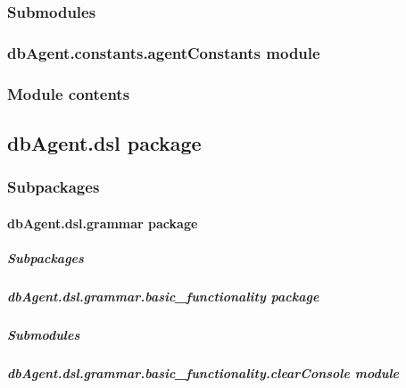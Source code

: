 \documentclass[letterpaper,10pt,english]{sphinxmanual}
\begin{document}
\subsubsection{Submodules}
\label{dbAgent.constants:submodules}

\subsubsection{dbAgent.constants.agentConstants module}
\label{dbAgent.constants:module-dbAgent.constants.agentConstants}\label{dbAgent.constants:dbagent-constants-agentconstants-module}

\subsubsection{Module contents}
\label{dbAgent.constants:module-dbAgent.constants}\label{dbAgent.constants:module-contents}

\subsection{dbAgent.dsl package}
\label{dbAgent.dsl::doc}\label{dbAgent.dsl:dbagent-dsl-package}

\subsubsection{Subpackages}
\label{dbAgent.dsl:subpackages}

\paragraph{dbAgent.dsl.grammar package}
\label{dbAgent.dsl.grammar:dbagent-dsl-grammar-package}\label{dbAgent.dsl.grammar::doc}

\subparagraph{Subpackages}
\label{dbAgent.dsl.grammar:subpackages}

\subparagraph{dbAgent.dsl.grammar.basic\_functionality package}
\label{dbAgent.dsl.grammar.basic_functionality:dbagent-dsl-grammar-basic-functionality-package}\label{dbAgent.dsl.grammar.basic_functionality::doc}

\subparagraph{Submodules}
\label{dbAgent.dsl.grammar.basic_functionality:submodules}

\subparagraph{dbAgent.dsl.grammar.basic\_functionality.clearConsole module}
\label{dbAgent.dsl.grammar.basic_functionality:dbagent-dsl-grammar-basic-functionality-clearconsole-module}\label{dbAgent.dsl.grammar.basic_functionality:module-dbAgent.dsl.grammar.basic_functionality.clearConsole}
\end{document}
